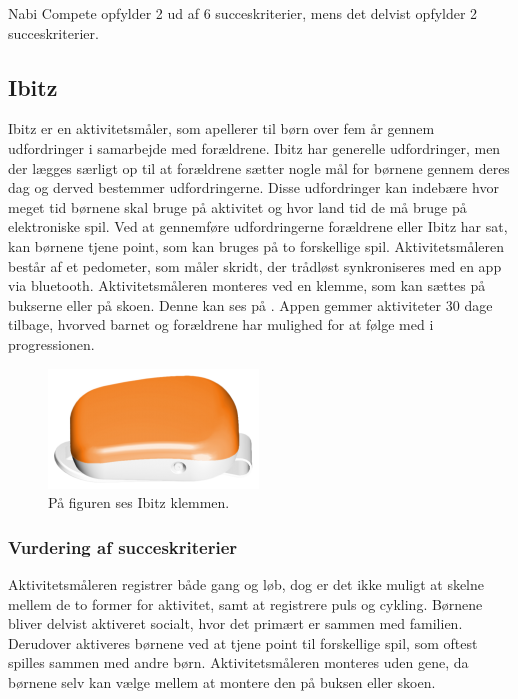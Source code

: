 Nabi Compete opfylder 2 ud af 6 succeskriterier, mens det delvist opfylder 2 succeskriterier.

\subsection{Ibitz}
Ibitz er en aktivitetsmåler, som apellerer til børn over fem år gennem udfordringer i samarbejde med forældrene. Ibitz har generelle udfordringer, men der lægges særligt op til at forældrene sætter nogle mål for børnene gennem deres dag og derved bestemmer udfordringerne. Disse udfordringer kan indebære hvor meget tid børnene skal bruge på aktivitet og hvor land tid de må bruge på elektroniske spil. Ved at gennemføre udfordringerne forældrene eller Ibitz har sat, kan børnene tjene point, som kan bruges på to forskellige spil. \newline
Aktivitetsmåleren består af et pedometer, som måler skridt, der trådløst synkroniseres med en app via bluetooth. Aktivitetsmåleren monteres ved en klemme, som kan sættes på bukserne eller på skoen. Denne kan ses på . Appen gemmer aktiviteter 30 dage tilbage, hvorved barnet og forældrene har mulighed for at følge med i progressionen. \citep{Ibitz_features2016}
\begin{figure}[H]
	\centering
	\includegraphics[scale=0.9]{figures/aProblemanalyse/ibitz.png}
	\caption{På figuren ses Ibitz klemmen.\citep{Ibitz_features2016}}
	\label{fig:ibitz}
\end{figure}

\subsubsection{Vurdering af succeskriterier}
Aktivitetsmåleren registrer både gang og løb, dog er det ikke muligt at skelne mellem de to former for aktivitet, samt at registrere puls og cykling. Børnene bliver delvist aktiveret socialt, hvor det primært er sammen med familien. Derudover aktiveres børnene ved at tjene point til forskellige spil, som oftest spilles sammen med andre børn. Aktivitetsmåleren monteres uden gene, da børnene selv kan vælge mellem at montere den på buksen eller skoen.  

